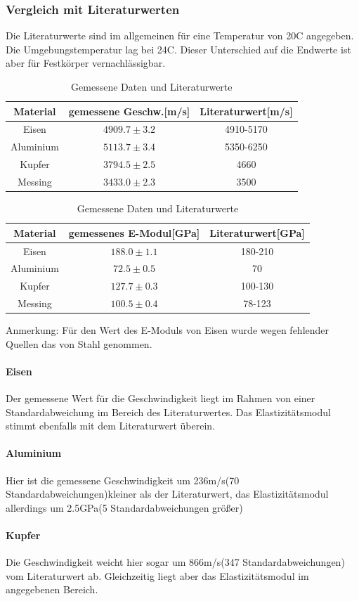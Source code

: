 \documentclass[12pt,a4paper]{article}
\begin{document}
\subsubsection{Vergleich mit Literaturwerten}
Die Literaturwerte sind im allgemeinen für eine Temperatur von 20C angegeben. Die Umgebungstemperatur lag bei 24C. Dieser Unterschied auf die Endwerte ist aber für Festkörper vernachlässigbar.
\begin{table}
\begin{tabular}{|c|c|c|}
\hline 
Material & gemessene Geschw.[m/s] & Literaturwert[m/s] \\ 
\hline 
Eisen & $4909.7\pm3.2$ & 4910-5170  \\ 
\hline 
Aluminium & $5113.7\pm3.4$ & 5350-6250  \\ 
\hline 
Kupfer & $3794.5\pm2.5$ & 4660 \\ 
\hline 
Messing & $3433.0\pm2.3$ & 3500 \\ 
\hline 
\end{tabular} 
\begin{tabular}{|c|c|c|}
\hline 
Material & gemessenes E-Modul[GPa] & Literaturwert[GPa] \\ 
\hline 
Eisen & $188.0\pm1.1$ & 180-210 \\ 
\hline 
Aluminium & $72.5\pm0.5$ & 70 \\ 
\hline 
Kupfer & $127.7\pm0.3$ & 100-130 \\ 
\hline 
Messing & $100.5\pm0.4$ & 78-123 \\ 
\hline 
\end{tabular} 
\caption{Gemessene Daten und Literaturwerte}
Anmerkung: Für den Wert des E-Moduls von Eisen wurde wegen fehlender Quellen das von Stahl genommen.
\end{table}
\paragraph{Eisen}
Der gemessene Wert für die Geschwindigkeit liegt im Rahmen von einer Standardabweichung im Bereich des Literaturwertes.
Das Elastizitätsmodul stimmt ebenfalls mit dem Literaturwert überein.
\paragraph{Aluminium}
Hier ist die gemessene Geschwindigkeit um 236m/s(70 Standardabweichungen)kleiner als der Literaturwert, das Elastizitätsmodul allerdings um 2.5GPa(5 Standardabweichungen größer)
\paragraph{Kupfer}
Die Geschwindigkeit weicht hier sogar um 866m/s(347 Standardabweichungen) vom Literaturwert ab. Gleichzeitig liegt aber das Elastizitätsmodul im angegebenen Bereich.
\end{document}
